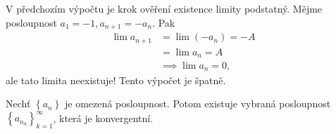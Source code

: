 \begin{poznamka}[Varování]
	V předchozím výpočtu je krok ověření existence limity podstatný.
	Mějme posloupnost $a_1 = -1, a_{n+1} = -a_n$. Pak
	\begin{align*}
	\lim a_{n+1} &= \lim (-a_n) = -A\\
	& = \lim a_n = A\\
		& \implies \lim a_n = 0,
	\end{align*}
	ale tato limita neexistuje! Tento výpočet je špatně.
\end{poznamka}

\begin{veta}\label{bolzano-weierstrass} %
	Nechť $\left \{ a_n \right \} $ je omezená posloupnost. Potom existuje vybraná posloupnost
	$\left \{ a_{n_k} \right \}_{k=1}^\infty $, která je konvergentní.
\end{veta}

